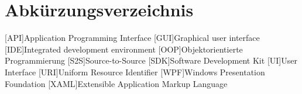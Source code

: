\chapter{Abkürzungsverzeichnis}
\begin{acronym}[XAML]
[API]{Application Programming Interface}
[GUI]{Graphical user interface}
[IDE]{Integrated development environment}
[OOP]{Objektorientierte Programmierung}
[S2S]{Source-to-Source}
[SDK]{Software Development Kit}
[UI]{User Interface}
[URI]{Uniform Resource Identifier}
[WPF]{Windows Presentation Foundation}
[XAML]{Extensible Application Markup Language}

\end{acronym}